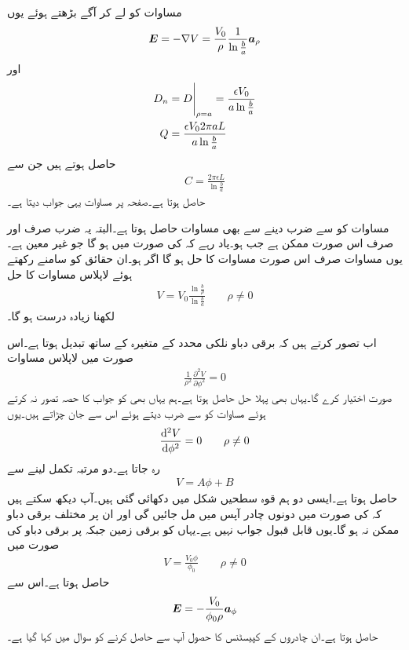 مساوات  کو لے کر آگے بڑھتے ہوئے یوں
\begin{align*}
{\ensuremath{{\boldsymbol{E}}}}=-\nabla V=\frac{V_0}{\rho} \frac{1}{\ln \frac{b}{a}} {\boldsymbol{a}}_{\rho}
\end{align*}
اور
\begin{align*}
D_n&=\eval{D}_{\rho=a}=\frac{\epsilon V_0}{a\ln \frac{b}{a}}\\
Q&=\frac{\epsilon V_0 2 \pi a L}{a \ln \frac{b}{a}}
\end{align*}
حاصل ہوتے ہیں جن سے
\begin{align}
C=\frac{2\pi \epsilon L}{\ln \frac{b}{a}}
\end{align}
حاصل ہوتا ہے۔صفحہ  پر مساوات  یہی جواب دیتا ہے۔

مساوات  کو  سے ضرب دینے سے بھی مساوات  حاصل ہوتا ہے۔البتہ یہ ضرب صرف اور صرف اس صورت ممکن ہے جب  ہو۔یاد رہے کہ  کی صورت میں  ہو گا جو غیر معین ہے۔یوں  مساوات  صرف اس صورت مساوات  کا حل ہو گا اگر  ہو۔ان حقائق کو سامنے رکھتے ہوئے لاپلاس مساوات کا حل
\begin{align}
V=V_0 \frac{\ln \frac{b}{\rho} }{\ln \frac{b}{a} } \quad \quad \rho \ne 0
\end{align}
لکھنا زیادہ درست ہو گا۔

اب تصور کرتے ہیں کہ برقی دباو نلکی محدد کے متغیرہ  کے ساتھ تبدیل ہوتا ہے۔اس صورت میں لاپلاس مساوات
\begin{align*}
\frac{1}{\rho^2}\frac{\partial^2 V}{\partial \phi^2}=0
\end{align*}
صورت اختیار کرے گا۔یہاں بھی پہلا حل  حاصل ہوتا ہے۔ہم یہاں بھی  کو جواب کا حصہ تصور نہ کرتے ہوئے مساوات کو  سے ضرب دیتے ہوئے اس سے جان چڑاتے ہیں۔یوں
\begin{align*}
\frac{\dif{^2} V}{\dif \phi^2}=0   \quad \quad \rho \ne 0
\end{align*}
رہ جاتا ہے۔دو مرتبہ تکمل لینے سے
\begin{align*}
V=A \phi+B
\end{align*}
حاصل ہوتا ہے۔ایسی دو ہم قوہ سطحیں شکل میں دکھائی گئی ہیں۔آپ دیکھ سکتے ہیں کہ  کی صورت میں دونوں چادر آپس میں مل جائیں گی اور ان پر مختلف برقی دباو ممکن نہ ہو گا۔یوں  قابل قبول جواب نہیں ہے۔یہاں  کو برقی زمین جبکہ  پر  برقی دباو کی صورت میں
\begin{align}
V=\frac{V_0\phi}{\phi_0}  \quad \quad \rho \ne 0
\end{align}
حاصل ہوتا ہے۔اس سے
\begin{align*}
{\ensuremath{{\boldsymbol{E}}}}=-\frac{V_0}{\phi_0 \rho}{\boldsymbol{a}}_{\phi}
\end{align*}
حاصل ہوتا ہے۔ان چادروں کے کپیسٹنس کا حصول آپ سے حاصل کرنے کو سوال میں کہا گیا ہے۔

